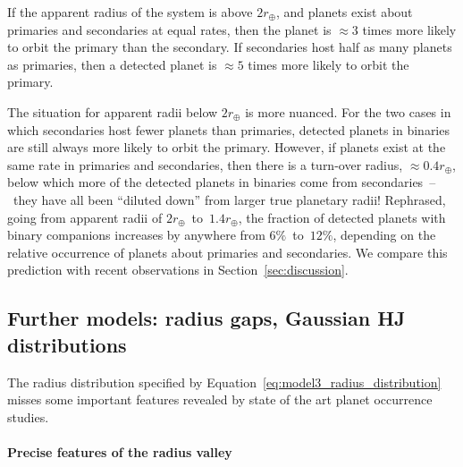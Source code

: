 \documentclass[12pt,modern]{aastex61}
\renewcommand{\a}{_{\rm a}}
\begin{document}
If the apparent radius of the system is above $2r_\oplus$, and planets
exist about primaries and secondaries at equal rates, then the planet
is $\approx\!3$ times more likely to orbit the primary than the
secondary.  If secondaries host half as many planets as primaries,
then a detected planet is $\approx\!5$ times more likely to orbit the
primary.

The situation for apparent radii below $2r_\oplus$ is more nuanced.
For the two cases in which secondaries host fewer planets than
primaries, detected planets in binaries are still always more likely
to orbit the primary.  However, if planets exist at the same rate in
primaries and secondaries, then there is a turn-over radius,
$\approx\!0.4r_\oplus$, below which more of the detected planets in
binaries come from secondaries~--~they have all been ``diluted down''
from larger true planetary radii!  Rephrased, going from apparent
radii of $2r_\oplus$~to~$1.4r_\oplus$, the fraction of detected
planets with binary companions increases by anywhere from
$6\%$~to~$12\%$, depending on the relative occurrence of planets about
primaries and secondaries.  We compare this prediction with recent
observations in Section~\ref{sec:discussion}.



\subsection{Further models: radius gaps, Gaussian HJ distributions}
\label{sec:further_models}

The radius distribution specified by
Equation~\ref{eq:model3_radius_distribution} misses some important
features revealed by state of the art planet occurrence studies.

\paragraph{Precise features of the radius valley}
\end{document}
